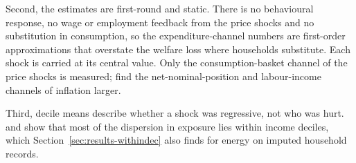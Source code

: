 Second, the estimates are first-round and static. There is no
behavioural response, no wage or employment feedback from the price
shocks and no substitution in consumption, so the expenditure-channel
numbers are first-order approximations that overstate the welfare loss
where households substitute. Each shock is carried at its central
value. Only the consumption-basket channel of the price shocks is
measured; \citet{ferreira2026} find the net-nominal-position and
labour-income channels of inflation larger.

Third, decile means describe whether a shock was regressive, not who
was hurt. \citet{borusyakjaravel2024} and \citet{levell2025} show
that most of the dispersion in exposure lies within income deciles,
which Section~\ref{sec:results-withindec} also finds for energy on
imputed household records.
